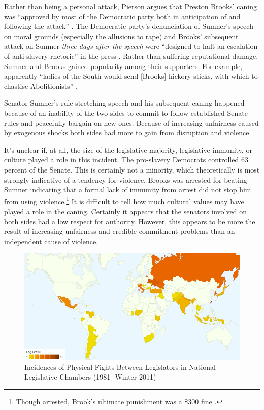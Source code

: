 \documentclass[a4paper]{article}\usepackage[]{graphicx}\usepackage[]{color}
\begin{document}
Rather than being a personal attack, Pierson argues that Preston Brooks' caning was ``approved by most of the Democratic party both in anticipation of and following the attack'' \cite[553]{Pierson1995}. The Democratic party's denunciation of Sumner's speech on moral grounds (especially the allusions to rape) and Brooks' subsequent attack on Sumner \emph{three days after the speech} were ``designed to halt an escalation of anti-slavery rhetoric'' in the press \cite[553]{Pierson1995}. Rather than suffering reputational damage, Sumner and Brooks gained popularity among their supporters. For example, apparently ``ladies of the South would send [Brooks] hickory sticks, with which to chastise Abolitionists'' \cite[255]{Donald2009}.

Senator Sumner's rule stretching speech and his subsequent caning happened because of an inability of the two sides to commit to follow established Senate rules and peacefully bargain on new ones. Because of increasing unfairness caused by exogenous shocks both sides had more to gain from disruption and violence.

It's unclear if, at all, the size of the legislative majority, legislative immunity, or culture played a role in this incident. The pro-slavery Democrats controlled 63 percent of the Senate. This is certainly not a minority, which theoretically is most strongly indicative of a tendency for violence. Brooks was arrested for beating Sumner indicating that a formal lack of immunity from arrest did not stop him from using violence.\footnote{Though arrested, Brook's ultimate punishment was a \$300 fine \cite[59]{Wolfe2004}.} It is difficult to tell how much cultural values may have played a role in the caning. Certainly it appears that the senators involved on both sides had a low respect for authority. However, this appears to be more the result of increasing unfairness and credible commitment problems than an independent cause of violence.

\begin{figure}[h!]
    \centering
    \caption{Incidences of Physical Fights Between Legislators in National Legislative Chambers (1981- Winter 2011)}
    \label{leg_map}
        \includegraphics[width = 13cm]{incidence_map.png}
\end{figure}
\end{document}
